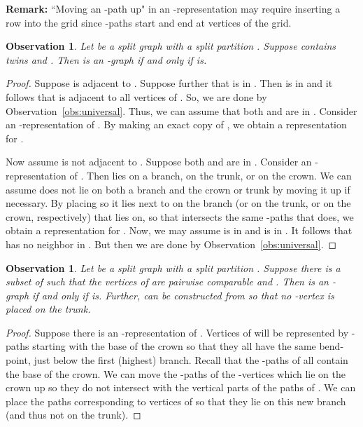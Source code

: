 \documentclass[11pt,3p,times]{elsarticle}
\newenvironment{myproof}{\begin{proof}}{\end{proof}}
\newtheorem{observation}[theorem]{Observation}
\begin{document}
\noindent \textbf{Remark:} ``Moving an -path up" in an -representation
may require inserting a row into the grid since -paths start and end
at vertices of the grid.
\begin{observation}\label{obs:twin}
Let  be a split graph  with a split partition .
Suppose  contains  twins  and . Then  is an -graph
if and only if  is. 
\end{observation}
\begin{myproof}
Suppose  is adjacent to . Suppose further that  is in .  Then 
is in  and it follows that  is adjacent to all vertices of
. So, we are done by Observation~\ref{obs:universal}. Thus,
we can assume that  both  and  are in . Consider an -representation of
. By making  an exact copy of , we obtain a
representation for .

Now assume  is not adjacent to  . Suppose both 
and  are in . Consider an -representation of .
Then  lies on a branch, on the trunk, or on the crown.
We can assume  does not lie on both a branch and the crown or trunk
by moving it up if necessary.  By placing 
so it lies next to  on the branch (or on the trunk, or on the crown, respectively)
that  lies on, so that  intersects the same -paths that  does,
we obtain a representation for .
Now, we may assume  is in  and  is in
. It follows that  has no neighbor in . But then we are
done by Observation~\ref{obs:universal}.
\end{myproof}
\begin{observation}\label{obs:threshold}
Let  be a split graph  with a split partition .
Suppose there is a subset  of  such that the vertices of
 are pairwise comparable and .
Then  is an -graph if and only if  is.
Further,  can be constructed from  so that no -vertex
is placed on the trunk.
\end{observation}
\begin{myproof}
Suppose
there is an -representation of . Vertices of
 will be represented by -paths starting with the base 
of the crown so that they all have the same bend-point,
just below the first (highest) branch.
Recall that the -paths of  all contain the base  of the crown.
We can move the -paths of the -vertices which lie on the crown up so they
do not intersect with the vertical parts of the paths of . We can place the
paths corresponding to vertices  of  so that they lie on this new branch (and
thus not on the trunk).
\end{myproof}
\end{document}

